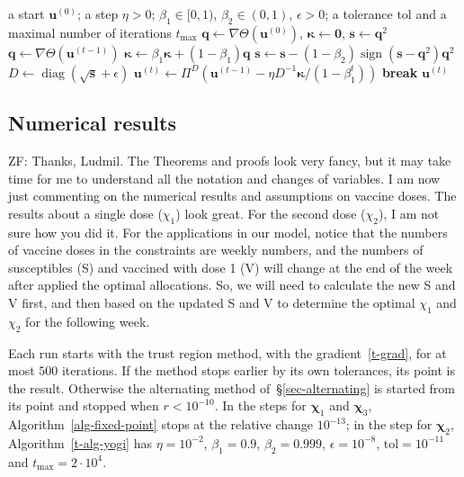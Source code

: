 \documentclass[11pt]{article}
\theoremstyle{plain}
\theoremstyle{definition}
\theoremstyle{remark}
\numberwithin{equation}{section}
\numberwithin{figure}{section}
\numberwithin{table}{section}
\numberwithin{algorithm}{section}
\begin{document}
\begin{algorithm}[ht]
\caption{Projected Yogi}\label{t-alg-yogi}
\begin{algorithmic}[1]
\Require a start $\bm u^{(0)}$; a step $\eta>0$;
$\beta_1\in[0,1)$, $\beta_2\in(0,1)$, $\epsilon>0$; a tolerance $\mathrm{tol}$
and a maximal number of iterations $t_{\max}$
\State $\bm q\gets\nabla\Theta\left(\bm u^{(0)}\right)$, $\bm\kappa\gets\bm 0$, $\bm s\gets\bm q^2$
  \State $\bm q\gets\nabla\Theta\left(\bm u^{(t-1)}\right)$
  \State $\bm\kappa\gets\beta_1\bm\kappa+(1-\beta_1)\bm q$
  \State $\bm s\gets\bm s-(1-\beta_2)\operatorname{sign}\left(\bm s-\bm q^2\right)\bm q^2$
  \State $D\gets\operatorname{diag}\left(\sqrt{\bm s}+\epsilon\right)$
  \State $\bm u^{(t)}\gets\Pi^D\left(\bm u^{(t-1)}-\eta D^{-1}\bm\kappa/\left(1-\beta_1^t\right)\right)$
    \State \textbf{break}
  \EndIf
\EndFor
\State \Return $\bm u^{(t)}$
\end{algorithmic}
\end{algorithm}

\subsection{Numerical results}\label{sec-three-numerics}

{\color{red} ZF: Thanks, Ludmil. The Theorems and proofs look very fancy, but it may take time for me to understand all the notation and changes of variables. I am now just commenting on the numerical results and assumptions on vaccine doses.
The results about a single dose ($\chi_1$) look great. For the second dose ($\chi_2$), I am not sure how you did it. For the applications in our model, notice that the numbers of vaccine doses in the constraints are weekly numbers, and the numbers of susceptibles (S) and vaccined with dose 1 (V) will change at the end of the week after applied the optimal allocations. So, we will need to calculate the new S and V first, and then based on the updated S and V to determine the optimal $\chi_1$ and $\chi_2$ for the following week.
}

Each run starts with the trust region method, with the
gradient~\eqref{t-grad}, for at most $500$ iterations. If the method stops
earlier by its own tolerances, its point is the result. Otherwise the
alternating method of~\S\ref{sec-alternating} is started from its point and
stopped when $r<10^{-10}$. In the steps for
$\bm\chi_1$ and $\bm\chi_3$, Algorithm~\ref{alg-fixed-point} stops at the
relative change $10^{-13}$; in the step for $\bm\chi_2$,
Algorithm~\ref{t-alg-yogi} has $\eta=10^{-2}$, $\beta_1=0.9$,
$\beta_2=0.999$, $\epsilon=10^{-8}$, $\mathrm{tol}=10^{-11}$ and
$t_{\max}=2\cdot 10^4$.
\end{document}

